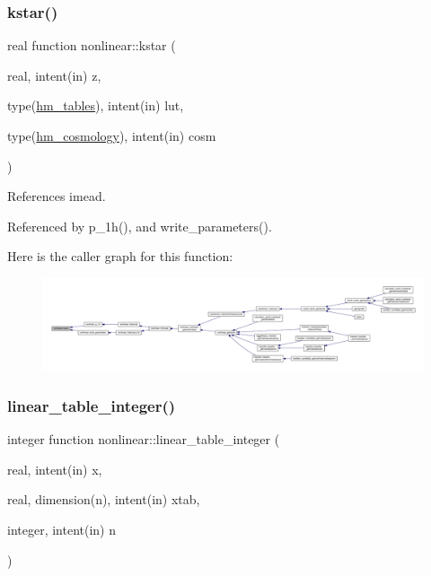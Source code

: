 \subsubsection{\texorpdfstring{kstar()}{kstar()}}
{\footnotesize\ttfamily real function nonlinear\+::kstar (\begin{DoxyParamCaption}\item[{real, intent(in)}]{z,  }\item[{type(\mbox{\hyperlink{structnonlinear_1_1hm__tables}{hm\+\_\+tables}}), intent(in)}]{lut,  }\item[{type(\mbox{\hyperlink{structnonlinear_1_1hm__cosmology}{hm\+\_\+cosmology}}), intent(in)}]{cosm }\end{DoxyParamCaption})\hspace{0.3cm}{\ttfamily [private]}}



References imead.



Referenced by p\+\_\+1h(), and write\+\_\+parameters().

Here is the caller graph for this function\+:
\nopagebreak
\begin{figure}[H]
\begin{center}
\leavevmode
\includegraphics[width=350pt]{namespacenonlinear_a0e7bfac54def3a760a789b01501ee54b_icgraph}
\end{center}
\end{figure}
\mbox{\label{namespacenonlinear_a623980d65535bc78bbcf5eb8f701ac42}} 
\subsubsection{\texorpdfstring{linear\+\_\+table\+\_\+integer()}{linear\_table\_integer()}}
{\footnotesize\ttfamily integer function nonlinear\+::linear\+\_\+table\+\_\+integer (\begin{DoxyParamCaption}\item[{real, intent(in)}]{x,  }\item[{real, dimension(n), intent(in)}]{xtab,  }\item[{integer, intent(in)}]{n }\end{DoxyParamCaption})\hspace{0.3cm}{\ttfamily [private]}}



